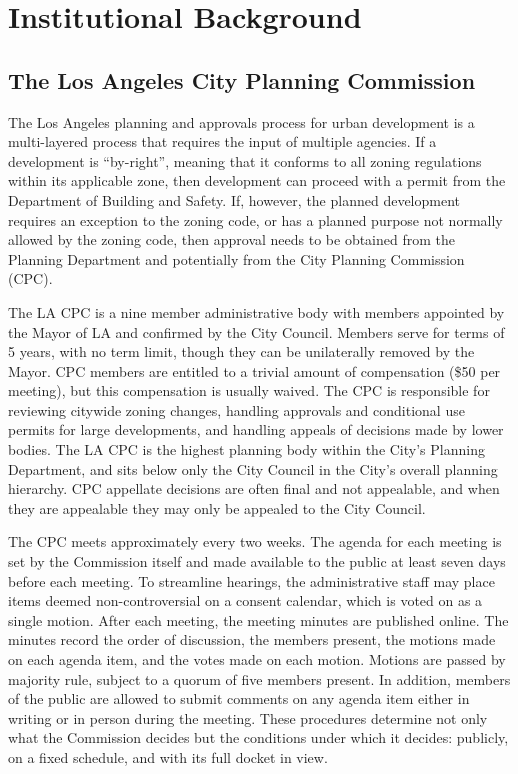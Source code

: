 \section{Institutional Background} \label{sec_background}

\subsection{The Los Angeles City Planning Commission}

The Los Angeles planning and approvals process for urban development is a multi-layered process that requires the input of multiple agencies. If a development is ``by-right'', meaning that it conforms to all zoning regulations within its applicable zone, then development can proceed with a permit from the Department of Building and Safety. If, however, the planned development requires an exception to the zoning code, or has a planned purpose not normally allowed by the zoning code, then approval needs to be obtained from the Planning Department and potentially from the City Planning Commission (CPC).

The LA CPC is a nine member administrative body with members appointed by the Mayor of LA and confirmed by the City Council. Members serve for terms of 5 years, with no term limit, though they can be unilaterally removed by the Mayor. CPC members are entitled to a trivial amount of compensation (\$50 per meeting), but this compensation is usually waived. The CPC is responsible for reviewing citywide zoning changes, handling approvals and conditional use permits for large developments, and handling appeals of decisions made by lower bodies. The LA CPC is the highest planning body within the City's Planning Department, and sits below only the City Council in the City's overall planning hierarchy. CPC appellate decisions are often final and not appealable, and when they are appealable they may only be appealed to the City Council. 

The CPC meets approximately every two weeks. The agenda for each meeting is set by the Commission itself and made available to the public at least seven days before each meeting. To streamline hearings, the administrative staff may place items deemed non-controversial on a consent calendar, which is voted on as a single motion. After each meeting, the meeting minutes are published online. The minutes record the order of discussion, the members present, the motions made on each agenda item, and the votes made on each motion. Motions are passed by majority rule, subject to a quorum of five members present. In addition, members of the public are allowed to submit comments on any agenda item either in writing or in person during the meeting. These procedures determine not only what the Commission decides but the conditions under which it decides: publicly, on a fixed schedule, and with its full docket in view.

